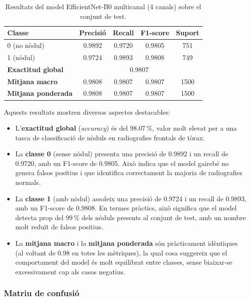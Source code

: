 \documentclass[12pt,a4paper]{article}
\begin{document}
\begin{table}[H]
    \centering
    \caption{Resultats del model EfficientNet-B0 multicanal (4 canals) sobre el conjunt de test.}
    \label{tab:effb0_4c_report}
    \begin{tabular}{lcccc}
        \toprule
        \textbf{Classe} & \textbf{Precisió} & \textbf{Recall} & \textbf{F1-score} & \textbf{Suport} \\
        \midrule
        0 (no nòdul) & 0.9892 & 0.9720 & 0.9805 & 751 \\
        1 (nòdul)    & 0.9724 & 0.9893 & 0.9808 & 749 \\
        \midrule
        \textbf{Exactitud global} & \multicolumn{4}{c}{0.9807} \\
        \textbf{Mitjana macro}    & 0.9808 & 0.9807 & 0.9807 & 1500 \\
        \textbf{Mitjana ponderada}& 0.9808 & 0.9807 & 0.9807 & 1500 \\
        \bottomrule
    \end{tabular}
\end{table}

Aquests resultats mostren diversos aspectes destacables:

\begin{itemize}
    \item L'\textbf{exactitud global} (\emph{accuracy}) és del 98.07\,\%, valor molt elevat per a una tasca de classificació de nòduls en radiografies frontals de tòrax.
    \item La \textbf{classe 0} (sense nòdul) presenta una precisió de 0.9892 i un recall de 0.9720, amb un F1-score de 0.9805. Això indica que el model gairebé no genera falsos positius i que identifica correctament la majoria de radiografies normals.
    \item La \textbf{classe 1} (amb nòdul) assoleix una precisió de 0.9724 i un recall de 0.9893, amb un F1-score de 0.9808. En termes pràctics, això significa que el model detecta prop del 99\,\% dels nòduls presents al conjunt de test, amb un nombre molt reduït de falsos positius.
    \item La \textbf{mitjana macro} i la \textbf{mitjana ponderada} són pràcticament idèntiques (al voltant de 0.98 en totes les mètriques), la qual cosa suggereix que el comportament del model és molt equilibrat entre classes, sense biaixar-se excessivament cap als casos negatius.
\end{itemize}

\subsubsection{Matriu de confusió}
\end{document}
